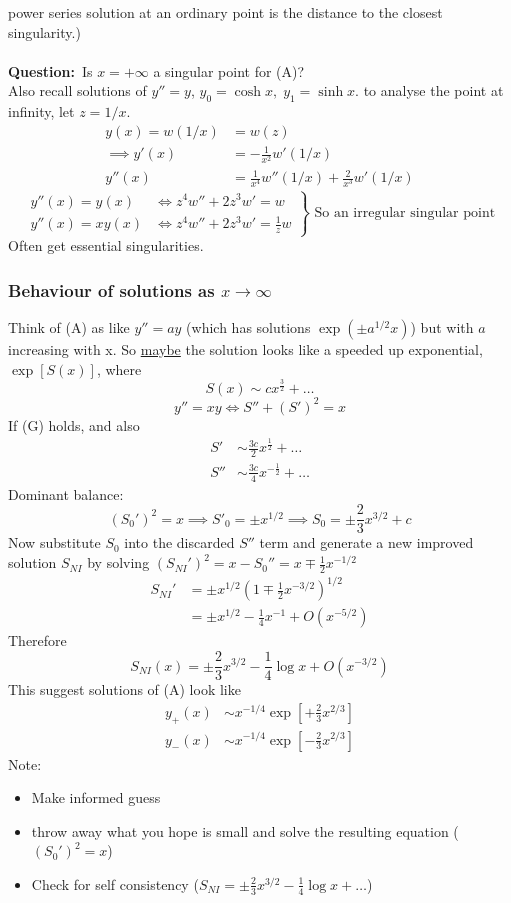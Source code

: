 \documentclass{article}
\newcommand{\question}{\textbf{Question:}}
\begin{document}
power series solution at an ordinary point is the distance to the closest 
singularity.)
\\
\\
\question\ Is $x= + \infty$ a singular point for (A)?
\\
Also recall solutions of $y'' = y$, $y_0 = \cosh x, \; y_1 = \sinh x$. to analyse the
point at infinity, let $z = 1/x$.
\begin{align*}
y(x) = w(1/x) &= w(z) \\
\implies y'(x) &= - \frac{1}{x^2} w'(1/x) \\
y''(x) &= \frac{1}{x^4} w''(1/x) + \frac{2}{x^3} w' ( 1/x)
\end{align*}
\[\left.  \begin{array}{ll}
y''(x) = y(x) &\iff z^4 w'' + 2 z^3 w' = w \\
y''(x) = xy(x) &\iff z^4 w'' + 2 z^3 w' = \frac{1}{z}w \end{array}
\right\} \mbox{ So an irregular singular point} \] 
Often get essential singularities.
\\
\subsubsection*{Behaviour of solutions as $x \to \infty$}
Think of (A) as like $y'' = ay$ (which has solutions $\exp(\pm a^{1/2} x)$)
but with $a$ increasing with x. So \underline{maybe} the solution looks like
a speeded up exponential, $\exp[S(x)]$, where 
\begin{equation}\tag{G}
S(x) \sim c x^{\frac{3}{2}} + \dots
\end{equation}
\[ y'' = xy \iff S'' + (S')^2 =x \]
If (G) holds, and also
\begin{align*}
S' & \sim \frac{3c}{2} x^{\frac{1}{2}} + \dots \\
S'' & \sim \frac{3c}{4} x^{-\frac{1}{2}} + \dots 
\end{align*}
Dominant balance:
\[ (S_0')^2 = x \implies S'_0 = \pm x^{1/2} \implies S_0 = \pm \frac{2}{3} x^{3/2} +c \]
Now substitute $S_0$ into the discarded $S''$ term and generate a new improved solution
$S_{NI}$ by solving $(S_{NI}')^2 = x - S_0'' = x\mp \frac{1}{2} x^{-1/2} $ 
\begin{align*}
S_{NI}' &= \pm x^{1/2} \left( 1 \mp \frac{1}{2} x^{-3/2} \right)^{1/2}  \\
 &= \pm x^{1/2} - \frac{1}{4} x^{-1} + O(x^{-5/2}) 
 \end{align*}
Therefore
\[S_{NI}(x) = \pm \frac{2}{3}x^{3/2} - \frac{1}{4} \log x + O(x^{-3/2}) \]
This suggest solutions of (A) look like
\begin{align*}
y_+(x) & \sim x^{-1/4} \exp \left[ + \frac{2}{3} x^{2/3} \right] \\
y_-(x) & \sim x^{-1/4} \exp \left[ - \frac{2}{3} x^{2/3} \right] 
\end{align*}
Note:
\begin{itemize}
\item Make informed guess
\item throw away what you hope is small and solve the resulting equation
      ($(S_0')^2 =x$)
\item Check for self consistency ($S_{NI} = \pm \frac{2}{3} x^{3/2} - 
      \frac{1}{4} \log x  +\dots$)
\end{itemize}
\end{document}

